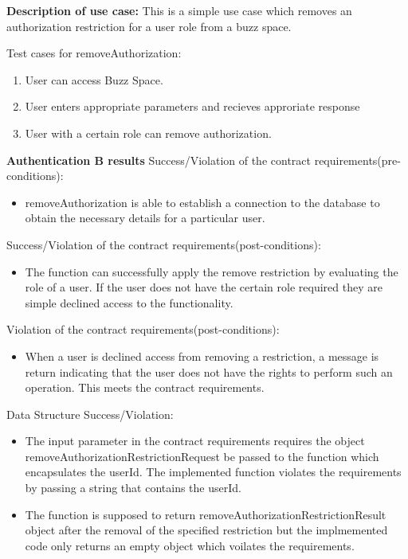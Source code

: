 \textbf{Description of use case:}\newline
This is a simple use case which removes an authorization restriction for a user role from a buzz space.


\medskip

\noindent
Test cases for removeAuthorization:
\begin{enumerate}
	\item User can access Buzz Space.
	\item User enters appropriate parameters and recieves approriate response
	\item User with a certain role can remove authorization.

\end{enumerate}

\noindent
\textbf{Authentication B results}\newline
Success/Violation of the contract requirements(pre-conditions):
\begin{itemize}
	\item removeAuthorization is able to establish a connection to the database to obtain the necessary details for a particular user.
\end{itemize}

\noindent
Success/Violation of the contract requirements(post-conditions):
\begin{itemize}
	\item The function can successfully apply the remove restriction by evaluating the role of a user. If the user does not have the certain role required they are simple declined access to the functionality.
\end{itemize} 

\noindent
Violation of the contract requirements(post-conditions):
\begin{itemize}
	\item When a user is declined access from removing a restriction, a message is return indicating that the user does not have the rights to perform such an operation. This meets the contract requirements.
\end{itemize}

\noindent
Data Structure Success/Violation:
\begin{itemize}
	\item The input parameter in the contract requirements requires the object removeAuthorizationRestrictionRequest be passed to the function which encapsulates the userId. The implemented function violates the requirements by passing a string that contains the userId.
	\item The function is supposed to return removeAuthorizationRestrictionResult object after the removal of the specified restriction but the implmemented code only returns an empty object which voilates the requirements.
\end{itemize} 











